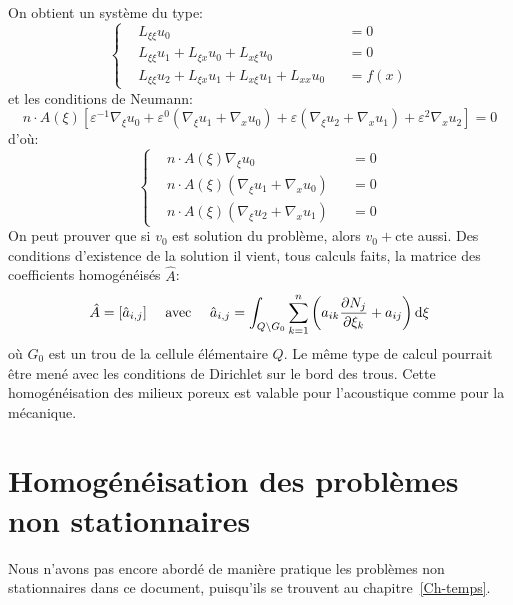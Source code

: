 On obtient un système du type:
\begin{equation}\left\{
\begin{aligned}
&L_{\xi\xi} u_0 &&=0\\
&L_{\xi\xi}u_1+L_{\xi x}u_0+L_{x\xi}u_0 &&=0\\
&L_{\xi\xi}u_2+L_{\xi x}u_1+L_{x\xi}u_1 +L_{xx}u_0 &&=f(x)
\end{aligned}
\right. \end{equation}
et les conditions de Neumann:
\begin{equation} n\cdot A(\xi)\left[ \varepsilon^{-1}\nabla_\xi u_0 + \varepsilon^0 (\nabla_\xi u_1+\nabla_x u_0) +
\varepsilon(\nabla_\xi u_2+\nabla_x u_1)+\varepsilon^2\nabla_x u_2
\right]=0 \end{equation}
d'où:
\begin{equation}\left\{
\begin{aligned}
&n\cdot A(\xi)\nabla_\xi u_0 &&=0\\
&n\cdot A(\xi) (\nabla_\xi u_1+\nabla_x u_0) &&=0\\
&n\cdot A(\xi)(\nabla_\xi u_2+\nabla_x u_1) &&=0
\end{aligned}
\right. \end{equation}
On peut prouver que si $v_0$ est solution du problème, alors $v_0+\text{cte}$ aussi.
\medskipvm
Des conditions d'existence de la solution il vient, tous calculs faits, la matrice des
coefficients homogénéisés $\hat{A}$:
\begin{equation} \hat{A} = [\hat{a}_{i,j} ]
\quad \text{ avec }
\quad
\hat{a}_{i,j}=\displaystyle\int_{Q\backslash G_0} \displaystyle\sum_{k=1}^n \left(a_{ik} \frac{\partial N_j}{\partial\xi_k} + a_{ij}
\right) \text{d}\xi
\end{equation}
où $G_0$ est un trou de la cellule élémentaire $Q$.
\medskipvm
Le même type de calcul pourrait être mené avec les conditions de Dirichlet sur le bord des trous.
\medskipvm
Cette homogénéisation des milieux poreux est valable pour l'acoustique comme pour la mécanique.

\medskip
\section{Homogénéisation des problèmes non stationnaires}
Nous n'avons pas encore abordé de manière pratique les problèmes non stationnaires dans ce document, puisqu'ils se trouvent au chapitre~\ref{Ch-temps}.


